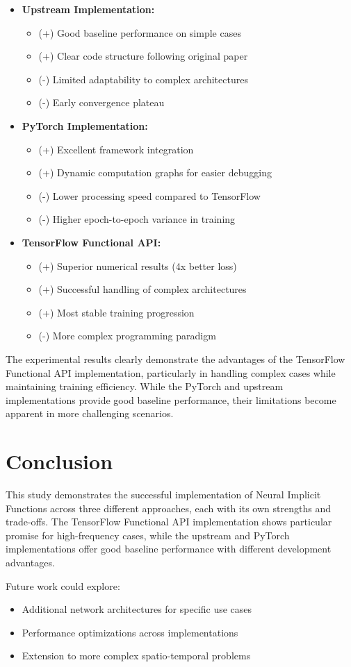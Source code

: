 \documentclass[10pt,journal,compsoc,onecolumn]{IEEEtran}
\begin{document}
\begin{itemize}
    \item \textbf{Upstream Implementation:}
    \begin{itemize}
        \item (+) Good baseline performance on simple cases
        \item (+) Clear code structure following original paper
        \item (-) Limited adaptability to complex architectures
        \item (-) Early convergence plateau
    \end{itemize}
    
    \item \textbf{PyTorch Implementation:}
    \begin{itemize}
        \item (+) Excellent framework integration
        \item (+) Dynamic computation graphs for easier debugging
        \item (-) Lower processing speed compared to TensorFlow
        \item (-) Higher epoch-to-epoch variance in training
    \end{itemize}
    
    \item \textbf{TensorFlow Functional API:}
    \begin{itemize}
        \item (+) Superior numerical results (4x better loss)
        \item (+) Successful handling of complex architectures
        \item (+) Most stable training progression
        \item (-) More complex programming paradigm
    \end{itemize}
\end{itemize}

The experimental results clearly demonstrate the advantages of the TensorFlow Functional API implementation, particularly in handling complex cases while maintaining training efficiency. While the PyTorch and upstream implementations provide good baseline performance, their limitations become apparent in more challenging scenarios.

\section{Conclusion}
This study demonstrates the successful implementation of Neural Implicit Functions across three different approaches, each with its own strengths and trade-offs. The TensorFlow Functional API implementation shows particular promise for high-frequency cases, while the upstream and PyTorch implementations offer good baseline performance with different development advantages.

Future work could explore:
\begin{itemize}
    \item Additional network architectures for specific use cases
    \item Performance optimizations across implementations
    \item Extension to more complex spatio-temporal problems
\end{itemize}



\end{document}
